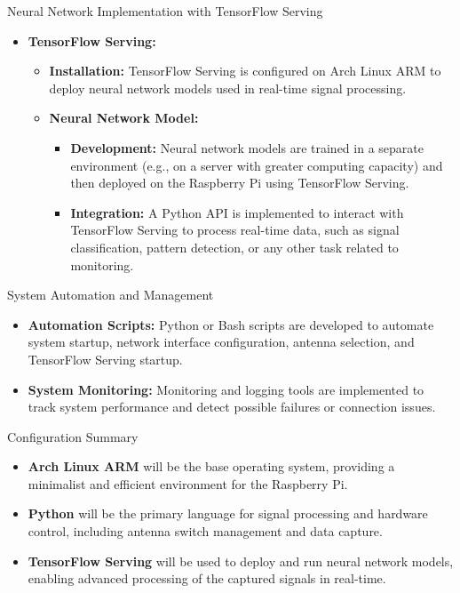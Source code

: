 \begin{list}{*}{}
	\item {Neural Network Implementation with TensorFlow Serving}
	\begin{itemize}
		\item \textbf{TensorFlow Serving:}
		\begin{itemize}
			\item \textbf{Installation:} TensorFlow Serving is configured on Arch Linux ARM to deploy neural network models used in real-time signal processing.
			\item \textbf{Neural Network Model:}
			\begin{itemize}
				\item \textbf{Development:} Neural network models are trained in a separate environment (e.g., on a server with greater computing capacity) and then deployed on the Raspberry Pi using TensorFlow Serving.
				\item \textbf{Integration:} A Python API is implemented to interact with TensorFlow Serving to process real-time data, such as signal classification, pattern detection, or any other task related to monitoring.
			\end{itemize}
		\end{itemize}
	\end{itemize}
	
	\item {System Automation and Management}
	\begin{itemize}
		\item \textbf{Automation Scripts:} Python or Bash scripts are developed to automate system startup, network interface configuration, antenna selection, and TensorFlow Serving startup.
		\item \textbf{System Monitoring:} Monitoring and logging tools are implemented to track system performance and detect possible failures or connection issues.
	\end{itemize}
	
	\item {Configuration Summary}
	
	\begin{itemize}
		\item \textbf{Arch Linux ARM} will be the base operating system, providing a minimalist and efficient environment for the Raspberry Pi.
		\item \textbf{Python} will be the primary language for signal processing and hardware control, including antenna switch management and data capture.
		\item \textbf{TensorFlow Serving} will be used to deploy and run neural network models, enabling advanced processing of the captured signals in real-time.
	\end{itemize}
	
\end{list}

